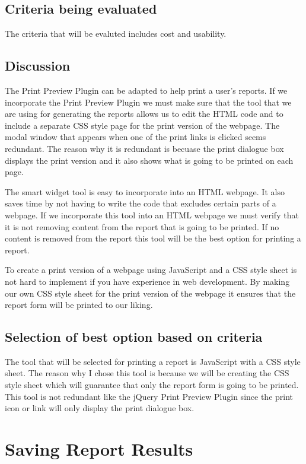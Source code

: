 \documentclass[12pt, draftclsnofoot, onecolumn]{IEEEtran}
\begin{document}
\subsection{Criteria being evaluated}
The criteria that will be evaluted includes cost and usability. 

\subsection{Discussion}
The Print Preview Plugin can be adapted to help print a user's reports. If we incorporate the Print Preview Plugin we must make sure that the tool that we are using for generating the reports allows us to edit the HTML code and to include a separate CSS style page for the print version of the webpage. The modal window that appears when one of the print links is clicked seems redundant. The reason why it is redundant is becuase the print dialogue box displays the print version and it also shows what is going to be printed on each page. 

The smart widget tool is easy to incorporate into an HTML webpage. It also saves time by not having to write the code that excludes certain parts of a webpage. If we incorporate this tool into an HTML webpage we must verify that it is not removing content from the report that is going to be printed. If no content is removed from the report this tool will be the best option for printing a report. 

To create a print version of a webpage using JavaScript and a CSS style sheet is not hard to implement if you have experience in web development. By making our own CSS style sheet for the print version of the webpage it ensures that the report form will be printed to our liking. 


\subsection{Selection of best option based on criteria} 
The tool that will be selected for printing a report is JavaScript with a CSS style sheet. The reason why I chose this tool is because we will be creating the CSS style sheet which will guarantee that only the report form is going to be printed. This tool is not redundant like the jQuery Print Preview Plugin since the print icon or link will only display the print dialogue box. 

\section{Saving Report Results}
\end{document}
